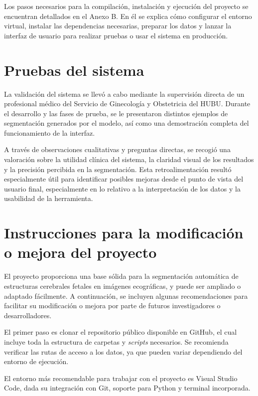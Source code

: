 Los pasos necesarios para la compilación, instalación y ejecución del proyecto se encuentran detallados en el Anexo B. En él se explica cómo configurar el entorno virtual, instalar las dependencias necesarias, preparar los datos y lanzar la interfaz de usuario para realizar pruebas o usar el sistema en producción.


\section{Pruebas del sistema}

La validación del sistema se llevó a cabo mediante la supervisión directa de un profesional médico del Servicio de Ginecología y Obstetricia del HUBU. Durante el desarrollo y las fases de prueba, se le presentaron distintos ejemplos de segmentación generados por el modelo, así como una demostración completa del funcionamiento de la interfaz.

A través de observaciones cualitativas y preguntas directas, se recogió una valoración sobre la utilidad clínica del sistema, la claridad visual de los resultados y la precisión percibida en la segmentación. Esta retroalimentación resultó especialmente útil para identificar posibles mejoras desde el punto de vista del usuario final, especialmente en lo relativo a la interpretación de los datos y la usabilidad de la herramienta.



\section{Instrucciones para la modificación o mejora del proyecto}

El proyecto proporciona una base sólida para la segmentación automática de estructuras cerebrales fetales en imágenes ecográficas, y puede ser ampliado o adaptado fácilmente. A continuación, se incluyen algunas recomendaciones para facilitar su modificación o mejora por parte de futuros investigadores o desarrolladores.

El primer paso es clonar el repositorio público disponible en GitHub, el cual incluye toda la estructura de carpetas y \textit{scripts} necesarios. Se recomienda verificar las rutas de acceso a los datos, ya que pueden variar dependiendo del entorno de ejecución.

El entorno más recomendable para trabajar con el proyecto es Visual Studio Code, dada su integración con Git, soporte para Python y terminal incorporada. 

